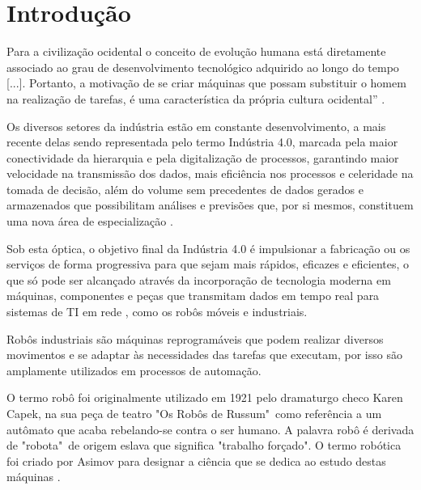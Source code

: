 \chapter{Introdução}


\begin{citacao}
Para a civilização ocidental o conceito de evolução humana está diretamente associado ao grau de desenvolvimento tecnológico adquirido ao longo do tempo [...]. Portanto, a motivação de se criar máquinas que possam substituir o homem na realização de tarefas, é uma característica da própria cultura ocidental'' \cite{romano2002introduccao}.
\end{citacao}

Os diversos setores da indústria estão em constante desenvolvimento, a mais recente delas sendo representada pelo termo Indústria 4.0, marcada pela maior conectividade da hierarquia e pela digitalização de processos, garantindo maior velocidade na transmissão dos dados, mais eficiência nos processos e celeridade na tomada de decisão, além do volume sem precedentes de dados gerados e armazenados que possibilitam análises e previsões que, por si mesmos, constituem uma nova área de especialização \cite{Arão_Silva_2023_intro}.


Sob esta óptica, o objetivo final da Indústria 4.0 é impulsionar a fabricação ou os serviços de forma progressiva para que sejam mais rápidos, eficazes e eficientes, o que só pode ser alcançado através da incorporação de tecnologia moderna em máquinas, componentes e peças que transmitam dados em tempo real para sistemas de TI em rede \cite{Anand_2024_intro}, como os robôs móveis e industriais. 

Robôs industriais  são máquinas reprogramáveis que podem realizar diversos movimentos e se adaptar às necessidades das tarefas que executam, por isso são amplamente utilizados em processos de automação.

O termo robô foi originalmente utilizado em 1921 pelo dramaturgo checo Karen Capek, na sua peça de teatro "Os Robôs de Russum"\ como referência a um autômato que acaba rebelando-se contra o ser humano. A palavra robô é derivada de "robota"\ de origem eslava que significa "trabalho forçado". O termo robótica foi criado por Asimov para designar a ciência que se dedica ao estudo destas máquinas \cite{sciavicco1995robotica}.


